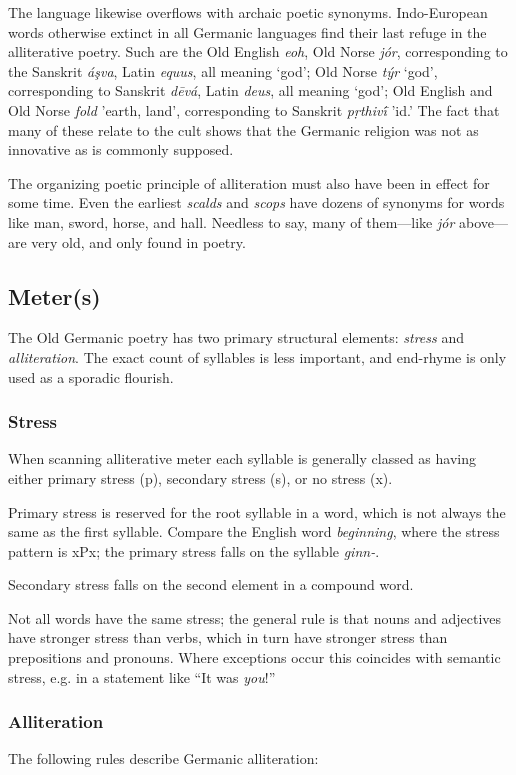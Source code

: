   The language likewise overflows with archaic poetic synonyms.  Indo-European words otherwise extinct in all Germanic languages find their last refuge in the alliterative poetry.  Such are the Old English \emph{eoh}, Old Norse \emph{jór}, corresponding to the Sanskrit \emph{áşva}, Latin \emph{equus}, all meaning ‘god’; Old Norse \emph{týr} ‘god’, corresponding to Sanskrit \emph{dēvá}, Latin \emph{deus}, all meaning ‘god’; Old English and Old Norse \emph{fold} 'earth, land', corresponding to Sanskrit \emph{pṛthivī́} 'id.'  The fact that many of these relate to the cult shows that the Germanic religion was not as innovative as is commonly supposed.

  The organizing poetic principle of alliteration must also have been in effect for some time. Even the earliest \emph{scalds} and \emph{scops} have dozens of synonyms for words like man, sword, horse, and hall. Needless to say, many of them—like \emph{jór} above—are very old, and only found in poetry.

  \subsection{Meter(s)}
    The Old Germanic poetry has two primary structural elements: \emph{stress} and \emph{alliteration}.  The exact count of syllables is less important, and end-rhyme is only used as a sporadic flourish.

    \subsubsection{Stress}
    When scanning alliterative meter each syllable is generally classed as having either primary stress (p), secondary stress (s), or no stress (x).

    Primary stress is reserved for the root syllable in a word, which is not always the same as the first syllable.  Compare the English word \emph{beginning}, where the stress pattern is xPx; the primary stress falls on the syllable \emph{ginn-}.

    Secondary stress falls on the second element in a compound word.

    Not all words have the same stress; the general rule is that nouns and adjectives have stronger stress than verbs, which in turn have stronger stress than prepositions and pronouns.  Where exceptions occur this coincides with semantic stress, e.g. in a statement like “It was \emph{you}!”

    \subsubsection{Alliteration}
    The following rules describe Germanic alliteration:

